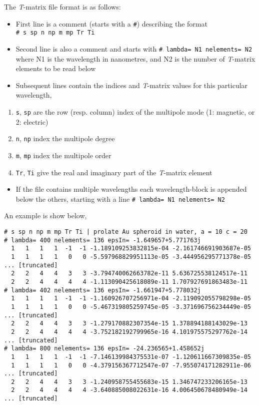 \documentclass[
]{article}
\providecommand{\tightlist}{%
  \setlength{\itemsep}{0pt}\setlength{\parskip}{0pt}}
\begin{document}
The \emph{T}-matrix file format is as follows:

\begin{itemize}
\tightlist
\item
  First line is a comment (starts with a \texttt{\#}) describing the
  format \texttt{\#\ s\ sp\ n\ np\ m\ mp\ Tr\ Ti}
\item
  Second line is also a comment and starts with
  \texttt{\#\ lambda=\ N1\ nelements=\ N2} where N1 is the wavelength in
  nanometres, and N2 is the number of \emph{T}-matrix elements to be
  read below
\item
  Subsequent lines contain the indices and \emph{T}-matrix values for
  this particular wavelength,
\end{itemize}

\begin{enumerate}
\def\labelenumi{\arabic{enumi}.}
\tightlist
\item
  \texttt{s}, \texttt{sp} are the row (resp. column) index of the
  multipole mode (1: magnetic, or 2: electric)
\item
  \texttt{n}, \texttt{np} index the multipole degree
\item
  \texttt{m}, \texttt{mp} index the multipole order
\item
  \texttt{Tr}, \texttt{Ti} give the real and imaginary part of the
  \emph{T}-matrix element
\end{enumerate}

\begin{itemize}
\tightlist
\item
  If the file contains multiple wavelengths each wavelength-block is
  appended below the others, starting with a line
  \texttt{\#\ lambda=\ N1\ nelements=\ N2}
\end{itemize}

An example is show below,

\begin{verbatim}
# s sp n np m mp Tr Ti | prolate Au spheroid in water, a = 10 c = 20
# lambda= 400 nelements= 136 epsIn= -1.649657+5.771763j
  1   1   1   1  -1  -1 -1.189109253832815e-04 -2.161746691903687e-05
  1   1   1   1   0   0 -5.597968829951113e-05 -3.444956295771378e-05
... [truncated]
  2   2   4   4   3   3 -3.794740062663782e-11 5.636725538124517e-11
  2   2   4   4   4   4 -1.113090425618089e-11 1.707927691863483e-11
# lambda= 402 nelements= 136 epsIn= -1.661947+5.778032j
  1   1   1   1  -1  -1 -1.160926707256971e-04 -2.119092055798298e-05
  1   1   1   1   0   0 -5.467319805259745e-05 -3.371696756234449e-05
... [truncated]
  2   2   4   4   3   3 -1.279170882307354e-15 1.378894188143029e-13
  2   2   4   4   4   4 -3.752182192799965e-16 4.101975575297762e-14
... [truncated]
# lambda= 800 nelements= 136 epsIn= -24.236565+1.458652j
  1   1   1   1  -1  -1 -7.146139984375531e-07 -1.120611667309835e-05
  1   1   1   1   0   0 -4.379156367712547e-07 -7.955074171282911e-06
... [truncated]
  2   2   4   4   3   3 -1.240958755455683e-15 1.346747233206165e-13
  2   2   4   4   4   4 -3.640885008022631e-16 4.006450678480949e-14
... [truncated]
\end{verbatim}
\end{document}
